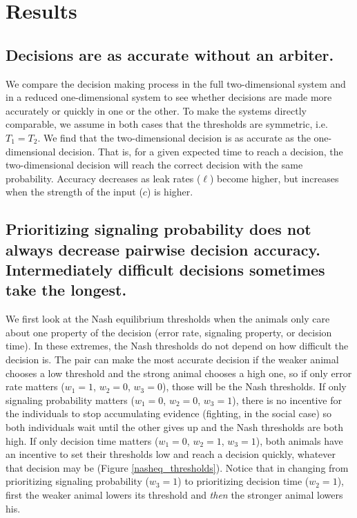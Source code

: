 \documentclass{article}
\begin{document}
\section{Results}

\subsection{Decisions are as accurate without an arbiter. }
We compare the decision making process in the full two-dimensional system and in a reduced one-dimensional system to see whether decisions are made more accurately or quickly in one or the other.  To make the systems directly comparable, we assume in both cases that the thresholds are symmetric, i.e. $T_1=T_2$.  We find that the two-dimensional decision is as accurate as the one-dimensional decision.  That is, for a given expected time to reach a decision, the two-dimensional decision will reach the correct decision with the same probability.  Accuracy decreases as leak rates ($\ell$) become higher, but increases when the strength of the input ($c$) is higher.

\subsection{Prioritizing signaling probability does not always decrease pairwise decision accuracy. Intermediately difficult decisions sometimes take the longest. }
We first look at the Nash equilibrium thresholds when the animals only care about one property of the decision (error rate, signaling property, or decision time).  In these extremes, the Nash thresholds do not depend on how difficult the decision is. The pair can make the most accurate decision if the weaker animal chooses a low threshold and the strong animal chooses a high one, so if only error rate matters ($w_1=1$, $w_2=0$, $w_3=0$), those will be the Nash  thresholds.   If only signaling probability matters ($w_1=0$, $w_2=0$, $w_3=1$), there is no incentive for the individuals to stop accumulating evidence (fighting, in the social case) so both individuals wait until the other gives up and the Nash  thresholds are both high.  If only decision time matters ($w_1=0$, $w_2=1$, $w_3=1$), both animals have an incentive to set their thresholds low and reach a decision quickly, whatever that decision may be (Figure \ref{nasheq_thresholds}).   Notice that in changing from prioritizing signaling probability ($w_3=1$) to prioritizing decision time ($w_2=1$), first the weaker animal lowers its threshold and \emph{then} the stronger animal lowers his.  
\end{document}

